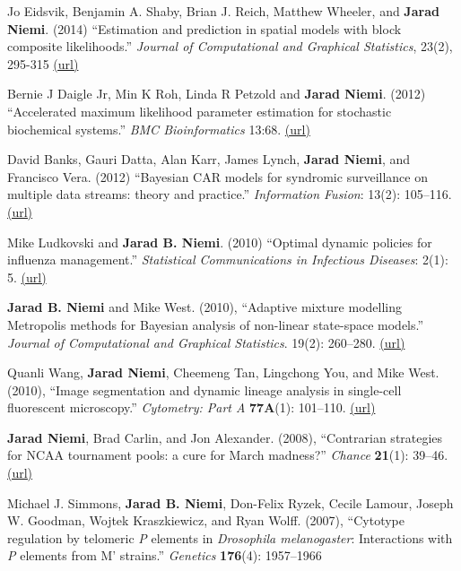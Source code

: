 \documentclass[overlapped,line]{res}
\begin{document}
\begin{resume}
Jo Eidsvik, Benjamin A. Shaby, Brian J. Reich, Matthew Wheeler, and {\bf Jarad Niemi}. (2014) ``Estimation and prediction in spatial models with block composite likelihoods.'' \emph{Journal of Computational and Graphical Statistics}, 23(2), 295-315 \href{http://amstat.tandfonline.com/doi/abs/10.1080/10618600.2012.760460}{(url)}

Bernie J Daigle Jr, Min K Roh, Linda R Petzold and {\bf Jarad Niemi}. (2012) ``Accelerated maximum likelihood parameter estimation for stochastic biochemical systems.'' \emph{BMC Bioinformatics} 13:68. \href{http://www.biomedcentral.com/1471-2105/13/68}{(url)}

David Banks, Gauri Datta, Alan Karr, James Lynch, {\bf Jarad Niemi}, and Francisco Vera. (2012) ``Bayesian CAR models for syndromic surveillance on multiple data streams: theory and practice.'' \emph{Information Fusion}: 13(2): 105--116. \href{http://www.sciencedirect.com/science/article/pii/S156625350900092X}{(url)}

Mike Ludkovski and {\bf Jarad B. Niemi}. (2010) ``Optimal dynamic policies for influenza management.'' \emph{Statistical Communications in Infectious Diseases}: 2(1): 5. \href{http://www.degruyter.com/view/j/scid.2010.2.1/scid.2010.2.1.1020/scid.2010.2.1.1020.xml}{(url)}

{\bf Jarad B. Niemi} and Mike West. (2010), ``Adaptive mixture modelling Metropolis methods for Bayesian analysis of non-linear state-space models.'' \emph{Journal of Computational and Graphical Statistics}. 19(2): 260--280. \href{http://www.tandfonline.com/doi/abs/10.1198/jcgs.2010.08117}{(url)}

Quanli Wang, {\bf Jarad Niemi}, Cheemeng Tan, Lingchong You, and Mike West. (2010), ``Image segmentation and dynamic lineage analysis in single-cell fluorescent microscopy.'' \emph{Cytometry: Part A} {\bf 77A}(1): 101--110. \href{http://onlinelibrary.wiley.com/doi/10.1002/cyto.a.20812/full}{(url)}

{\bf Jarad Niemi}, Brad Carlin, and Jon Alexander. (2008), ``Contrarian strategies for NCAA tournament pools: a cure for March madness?'' \emph{Chance} {\bf 21}(1): 39--46. \href{http://amstat.tandfonline.com/doi/pdf/10.1080/09332480.2008.10722884}{(url)}


Michael J. Simmons, {\bf Jarad B. Niemi}, Don-Felix Ryzek, Cecile Lamour, Joseph W. Goodman, Wojtek Kraszkiewicz, and Ryan Wolff. (2007), ``Cytotype regulation by telomeric \emph{P} elements in \emph{Drosophila melanogaster}: Interactions with \emph{P} elements from M' strains.'' \emph{Genetics} {\bf 176}(4): 1957--1966


\end{resume}
\end{document}

